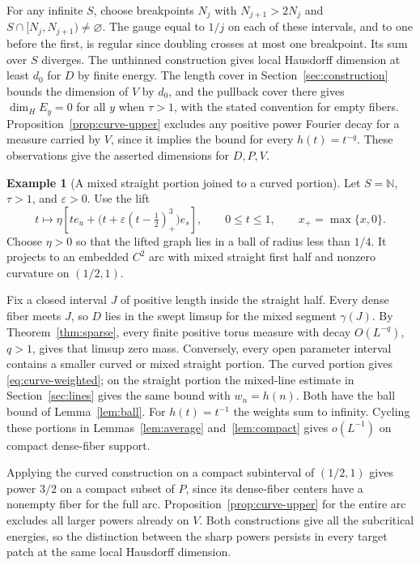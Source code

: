 \documentclass[11pt,a4paper,reqno]{amsart}
\theoremstyle{definition}
\newtheorem{example}[theorem]{Example}
\theoremstyle{remark}
\numberwithin{equation}{section}
\begin{document}
For any infinite \(S\), choose breakpoints \(N_j\) with
\(N_{j+1}>2N_j\) and \(S\cap[N_j,N_{j+1})\ne\varnothing\).
The gauge equal to \(1/j\) on each of these intervals, and to one
before the first, is regular since doubling crosses at most one
breakpoint. Its sum over \(S\) diverges. The unthinned construction
gives local Hausdorff dimension at least \(d_0\) for \(D\) by finite
energy. The length cover in Section~\ref{sec:construction} bounds the
dimension of \(V\) by \(d_0\), and the pullback cover there gives
\(\dim_H E_y=0\) for all \(y\) when \(\tau>1\), with the stated
convention for empty fibers. Proposition~\ref{prop:curve-upper}
excludes any positive power Fourier decay for a measure carried by
\(V\), since it implies the bound for every \(h(t)=t^{-q}\).
These observations give the asserted dimensions for \(D,P,V\).

\begin{example}[A mixed straight portion joined to a curved portion]
\label{ex:curve-mixed}
Let \(S=\mathbb N\), \(\tau>1\), and \(\varepsilon>0\). Use the lift
\[
 t\longmapsto \eta\left[t e_u+
        \bigl(t+\varepsilon(t-\tfrac12)_+^3\bigr)e_s\right],
 \qquad 0\le t\le1,\qquad x_+=\max\{x,0\}.
\]
Choose \(\eta>0\) so that the lifted graph lies in a ball of radius
less than \(1/4\). It projects to an embedded \(C^2\) arc with mixed
straight first half and nonzero curvature on \((1/2,1)\).

Fix a closed interval \(J\) of positive length inside the straight
half. Every dense fiber meets \(J\), so \(D\) lies in the swept
limsup for the mixed segment \(\gamma(J)\). By Theorem~\ref{thm:sparse},
every finite positive torus measure with decay \(O(L^{-q})\), \(q>1\), gives that limsup
zero mass. Conversely, every open parameter interval contains a smaller
curved or mixed straight portion. The curved portion gives
\eqref{eq:curve-weighted}; on the straight portion the mixed-line
estimate in Section~\ref{sec:lines} gives the same bound with
\(w_n=h(n)\). Both have the ball bound of Lemma~\ref{lem:ball}.
For \(h(t)=t^{-1}\) the weights sum to infinity. Cycling these portions
in Lemmas~\ref{lem:average} and~\ref{lem:compact} gives \(o(L^{-1})\)
on compact dense-fiber support.

Applying the curved construction on a compact subinterval of
\((1/2,1)\) gives power \(3/2\) on a compact subset of \(P\), since
its dense-fiber centers have a nonempty fiber for the full arc.
Proposition~\ref{prop:curve-upper} for the entire arc excludes all
larger powers already on \(V\). Both constructions give all the
subcritical energies, so the distinction between the sharp powers
persists in every target patch at the same local Hausdorff dimension.
\end{example}
\end{document}
